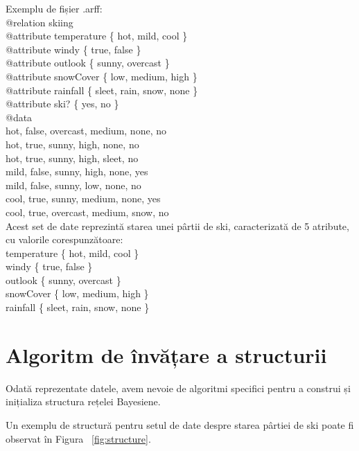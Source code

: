 Exemplu de fișier .arff:\\
@relation skiing \\
@attribute temperature \{ hot, mild, cool \}\\
@attribute windy \{ true, false \}\\
@attribute outlook \{ sunny, overcast \}\\
@attribute snowCover \{ low, medium, high \}\\
@attribute rainfall \{ sleet, rain, snow, none \}\\
@attribute ski? \{ yes, no \}\\
@data\\
hot, false, overcast, medium, none, no\\
hot, true, sunny, high, none, no\\
hot, true, sunny, high, sleet, no\\
mild, false, sunny, high, none, yes\\
mild, false, sunny, low, none, no\\
cool, true, sunny, medium, none, yes\\
cool, true, overcast, medium, snow, no\\

Acest set de date reprezintă starea unei pârtii de ski, caracterizată de 5 atribute, cu valorile corespunzătoare:\\
temperature \{ hot, mild, cool \}\\
windy \{ true, false \}\\
outlook \{ sunny, overcast \}\\
snowCover \{ low, medium, high \}\\
rainfall \{ sleet, rain, snow, none \}\\

\section{Algoritm de învățare a structurii}

Odată reprezentate datele, avem nevoie de algoritmi specifici pentru a construi și inițializa structura rețelei Bayesiene.

Un exemplu de structură pentru setul de date despre starea pârtiei de ski poate fi observat în Figura ~\ref{fig:structure}.

